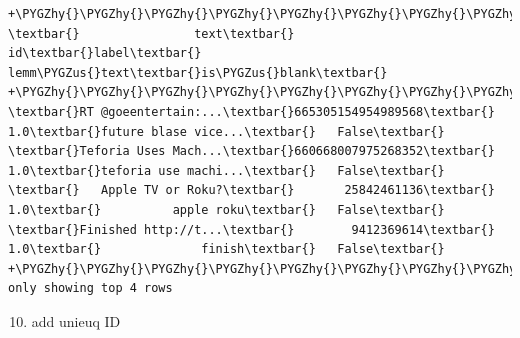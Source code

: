 \documentclass[letterpaper,11pt,english]{sphinxmanual}
\def\PYGZus{\char`\_}
\def\PYGZhy{\char`\-}
\begin{document}
\begin{Verbatim}[commandchars=\\\{\}]
+\PYGZhy{}\PYGZhy{}\PYGZhy{}\PYGZhy{}\PYGZhy{}\PYGZhy{}\PYGZhy{}\PYGZhy{}\PYGZhy{}\PYGZhy{}\PYGZhy{}\PYGZhy{}\PYGZhy{}\PYGZhy{}\PYGZhy{}\PYGZhy{}\PYGZhy{}\PYGZhy{}\PYGZhy{}\PYGZhy{}+\PYGZhy{}\PYGZhy{}\PYGZhy{}\PYGZhy{}\PYGZhy{}\PYGZhy{}\PYGZhy{}\PYGZhy{}\PYGZhy{}\PYGZhy{}\PYGZhy{}\PYGZhy{}\PYGZhy{}\PYGZhy{}\PYGZhy{}\PYGZhy{}\PYGZhy{}\PYGZhy{}+\PYGZhy{}\PYGZhy{}\PYGZhy{}\PYGZhy{}\PYGZhy{}+\PYGZhy{}\PYGZhy{}\PYGZhy{}\PYGZhy{}\PYGZhy{}\PYGZhy{}\PYGZhy{}\PYGZhy{}\PYGZhy{}\PYGZhy{}\PYGZhy{}\PYGZhy{}\PYGZhy{}\PYGZhy{}\PYGZhy{}\PYGZhy{}\PYGZhy{}\PYGZhy{}\PYGZhy{}\PYGZhy{}+\PYGZhy{}\PYGZhy{}\PYGZhy{}\PYGZhy{}\PYGZhy{}\PYGZhy{}\PYGZhy{}\PYGZhy{}+
\textbar{}                text\textbar{}                id\textbar{}label\textbar{}           lemm\PYGZus{}text\textbar{}is\PYGZus{}blank\textbar{}
+\PYGZhy{}\PYGZhy{}\PYGZhy{}\PYGZhy{}\PYGZhy{}\PYGZhy{}\PYGZhy{}\PYGZhy{}\PYGZhy{}\PYGZhy{}\PYGZhy{}\PYGZhy{}\PYGZhy{}\PYGZhy{}\PYGZhy{}\PYGZhy{}\PYGZhy{}\PYGZhy{}\PYGZhy{}\PYGZhy{}+\PYGZhy{}\PYGZhy{}\PYGZhy{}\PYGZhy{}\PYGZhy{}\PYGZhy{}\PYGZhy{}\PYGZhy{}\PYGZhy{}\PYGZhy{}\PYGZhy{}\PYGZhy{}\PYGZhy{}\PYGZhy{}\PYGZhy{}\PYGZhy{}\PYGZhy{}\PYGZhy{}+\PYGZhy{}\PYGZhy{}\PYGZhy{}\PYGZhy{}\PYGZhy{}+\PYGZhy{}\PYGZhy{}\PYGZhy{}\PYGZhy{}\PYGZhy{}\PYGZhy{}\PYGZhy{}\PYGZhy{}\PYGZhy{}\PYGZhy{}\PYGZhy{}\PYGZhy{}\PYGZhy{}\PYGZhy{}\PYGZhy{}\PYGZhy{}\PYGZhy{}\PYGZhy{}\PYGZhy{}\PYGZhy{}+\PYGZhy{}\PYGZhy{}\PYGZhy{}\PYGZhy{}\PYGZhy{}\PYGZhy{}\PYGZhy{}\PYGZhy{}+
\textbar{}RT @goeentertain:...\textbar{}665305154954989568\textbar{}  1.0\textbar{}future blase vice...\textbar{}   False\textbar{}
\textbar{}Teforia Uses Mach...\textbar{}660668007975268352\textbar{}  1.0\textbar{}teforia use machi...\textbar{}   False\textbar{}
\textbar{}   Apple TV or Roku?\textbar{}       25842461136\textbar{}  1.0\textbar{}          apple roku\textbar{}   False\textbar{}
\textbar{}Finished http://t...\textbar{}        9412369614\textbar{}  1.0\textbar{}              finish\textbar{}   False\textbar{}
+\PYGZhy{}\PYGZhy{}\PYGZhy{}\PYGZhy{}\PYGZhy{}\PYGZhy{}\PYGZhy{}\PYGZhy{}\PYGZhy{}\PYGZhy{}\PYGZhy{}\PYGZhy{}\PYGZhy{}\PYGZhy{}\PYGZhy{}\PYGZhy{}\PYGZhy{}\PYGZhy{}\PYGZhy{}\PYGZhy{}+\PYGZhy{}\PYGZhy{}\PYGZhy{}\PYGZhy{}\PYGZhy{}\PYGZhy{}\PYGZhy{}\PYGZhy{}\PYGZhy{}\PYGZhy{}\PYGZhy{}\PYGZhy{}\PYGZhy{}\PYGZhy{}\PYGZhy{}\PYGZhy{}\PYGZhy{}\PYGZhy{}+\PYGZhy{}\PYGZhy{}\PYGZhy{}\PYGZhy{}\PYGZhy{}+\PYGZhy{}\PYGZhy{}\PYGZhy{}\PYGZhy{}\PYGZhy{}\PYGZhy{}\PYGZhy{}\PYGZhy{}\PYGZhy{}\PYGZhy{}\PYGZhy{}\PYGZhy{}\PYGZhy{}\PYGZhy{}\PYGZhy{}\PYGZhy{}\PYGZhy{}\PYGZhy{}\PYGZhy{}\PYGZhy{}+\PYGZhy{}\PYGZhy{}\PYGZhy{}\PYGZhy{}\PYGZhy{}\PYGZhy{}\PYGZhy{}\PYGZhy{}+
only showing top 4 rows
\end{Verbatim}
\begin{enumerate}
\setcounter{enumi}{9}
\item {} 
add unieuq ID

\end{enumerate}
\end{document}
